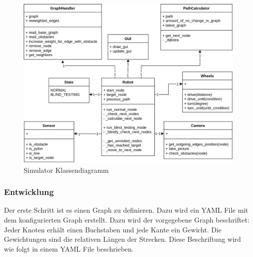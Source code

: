 \begin{figure}[H]
\centering
\includegraphics[width=\textwidth]{assets/informatik-prototyp/simulator/simulator-erd.png}
\caption{Simulator Klassendiagramm}
\label{fig:simulator-classdia}
\end{figure}

\subsubsection{Entwicklung}

Der erste Schritt ist es einen Graph zu definieren. Dazu wird ein YAML File mit dem konfigurierten Graph erstellt. 
Dazu wird der vorgegebene Graph beschriftet: Jeder Knoten erhält einen Buchstaben und jede Kante ein Gewicht. Die Gewichtungen sind die relativen Längen der Strecken. Diese Beschriftung wird wie folgt in einem YAML File beschrieben.

